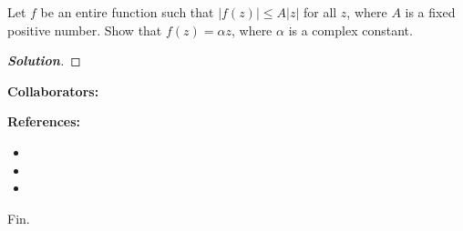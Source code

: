 \documentclass[11pt]{article}
\newenvironment{problem}[2][Problem\!]{\begin{trivlist}
\item[\hskip \labelsep {\bfseries #1}\hskip \labelsep {\bfseries #2}]}{\end{trivlist}}
\newenvironment{solution}{\begin{proof}[\textbf{\textit{Solution}}] }{\end{proof}}
\newcommand{\abs}[1]{\left\lvert#1\right\rvert} %
\renewcommand{\leq}{\leqslant}
\begin{document}
\newpage  %

\begin{problem}{8.5}
Let $f$ be an entire function such that $\abs{f(z)} \leq A\abs{z}$ for all $z$, where $A$ is a fixed positive number. Show that $f(z) = \alpha z$, where $\alpha$ is a complex constant.
\end{problem}
\begin{solution}
\end{solution}


\newpage  %

\begin{center}
\textbf{Collaborators:}
\end{center}
\vfill 

\begin{center}
\textbf{References:}
\end{center}
\begin{itemize}
\item[$\bullet$] [Book(s): Title, Author]
\item[$\bullet$] [Online: \href{http://example.com/}{\color{blue}Link}]
\item[$\bullet$] [Notes: \href{http://example.com/}{\color{blue}Link}]
\end{itemize}

\vfill
\begin{center}
Fin.
\end{center}
\vfill
\end{document}
